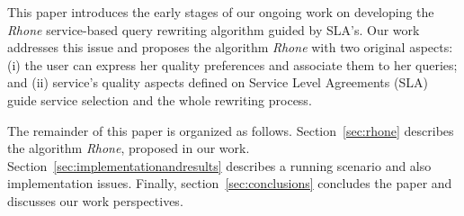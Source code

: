 This paper introduces the early stages of our
ongoing work on developing the \textit{Rhone} service-based query rewriting
algorithm guided by SLA's. Our work addresses this issue and proposes the 
algorithm \textit{Rhone} with two original aspects: (i) the user can express
her quality preferences and associate them to her queries; and (ii)  service's
quality aspects defined on Service Level Agreements (SLA) guide service
selection and  the whole rewriting process.

 The remainder of this paper is organized as follows. Section~\ref{sec:rhone}
 describes the algorithm \textit{Rhone}, proposed in our work.
 Section~\ref{sec:implementationandresults} describes a running scenario and also
 implementation issues.
 Finally, section~\ref{sec:conclusions} concludes the paper and discusses our work perspectives.

